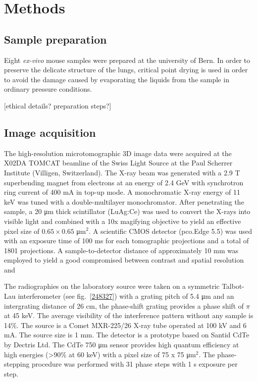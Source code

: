 \section{Methods}\label{sec:methods}
\subsection{Sample preparation}
Eight \emph{ex-vivo} mouse samples were prepared at the university of Bern.
In order to preserve the delicate structure of the lungs, critical point
drying is used in order to avoid the damage caused by evaporating the liquids
from the sample in ordinary pressure conditions.

[ethical details? preparation steps?]

\subsection{Image acquisition}\label{sec:acquisition}
The high-resolution microtomographic 3D image data were acquired at the X02DA
TOMCAT beamline of the Swiss Light Source at the Paul Scherrer Institute
(Villigen, Switzerland). The X-ray beam was generated with a 2.9 T superbending
magnet from electrons at an energy of 2.4 GeV with synchrotron ring current of 400 mA in top-up mode. A monochromatic X-ray energy of 11 keV was tuned with a double-multilayer monochromator. After penetrating the sample, a 20 μm thick scintillator (LuAg:Ce) was used to convert the X-rays into visible light and combined with a 10x magifying objective to yield an effective pixel size of $0.65 \times 0.65$
μm$^2$. A scientific CMOS detector (pco.Edge 5.5) was used with an exposure time of 100 ms for each tomographic projections and a total of 1801 projections. A sample-to-detector distance of approximately 10 mm was employed to yield a good compromised between contrast and spatial resolution and 

The radiographies on the laboratory source were taken on a symmetric
Talbot-Lau interferometer (see fig.~\ref{248327}) with a grating pitch of 5.4 μm and an intergrating
distance of 26 cm, the phase-shift grating provides a phase shift of $\pi$
at 45 keV. The average visibility of the interference pattern without any
sample is 14\%. The source is a Comet MXR-225/26 X-ray tube operated at 100
kV and 6 mA. The source size is 1 mm. The detector is a prototype based on
Santid CdTe by Dectris Ltd. The CdTe 750 μm sensor provides high quantum
efficiency at high energies (>90\% at 60 keV) with a pixel size of 75 x 75
μm$^2$. The phase-stepping procedure was performed with 31 phase steps with
1 s exposure per step.
